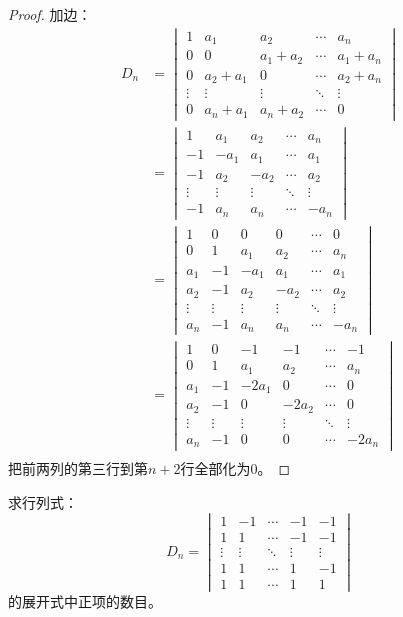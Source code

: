 \begin{proof}
	加边：
	\begin{align*}
		D_n&=
		\begin{vmatrix}
			1 & a_1 & a_2 & \cdots & a_n \\
			0 & 0 & a_1+a_2 & \cdots & a_1+a_n \\
			0 & a_2+a_1 & 0 & \cdots & a_2+a_n \\
			\vdots & \vdots & \vdots & \ddots & \vdots \\
			0 & a_n+a_1 & a_n+a_2 & \cdots & 0
		\end{vmatrix} \\
		&=
		\begin{vmatrix}
			1 & a_1 & a_2 & \cdots & a_n \\
			-1 & -a_1 & a_1 & \cdots & a_1 \\
			-1 & a_2 & -a_2 & \cdots & a_2 \\
			\vdots & \vdots & \vdots & \ddots & \vdots \\
			-1 & a_n & a_n & \cdots & -a_n
		\end{vmatrix} \\
		&=
		\begin{vmatrix}
			1 & 0 & 0 & 0 & \cdots & 0 \\
			0 & 1 & a_1 & a_2 & \cdots & a_n \\
			a_1 & -1 & -a_1 & a_1 & \cdots & a_1 \\
			a_2 & -1 & a_2 & -a_2 & \cdots & a_2 \\
			\vdots & \vdots & \vdots & \vdots & \ddots & \vdots \\
			a_n & -1 & a_n & a_n & \cdots & -a_n
		\end{vmatrix} \\
		&=
		\begin{vmatrix}
			1 & 0 & -1 & -1 & \cdots & -1 \\
			0 & 1 & a_1 & a_2 & \cdots & a_n \\
			a_1 & -1 & -2a_1 & 0 & \cdots & 0 \\
			a_2 & -1 & 0 & -2a_2 & \cdots & 0 \\
			\vdots & \vdots & \vdots & \vdots & \ddots & \vdots \\
			a_n & -1 & 0 & 0 & \cdots & -2a_n
		\end{vmatrix} \\
	\end{align*}
	把前两列的第三行到第$n+2$行全部化为0。
\end{proof}
\begin{theorem}
	求行列式：
	\begin{equation*}
		D_n=
		\begin{vmatrix}
			1 & -1 & \cdots & -1 & -1 \\
			1 & 1 & \cdots & -1 & -1 \\
			\vdots & \vdots & \ddots & \vdots & \vdots \\
			1 & 1 & \cdots & 1 & -1 \\
			1 & 1 & \cdots & 1 & 1
		\end{vmatrix}
	\end{equation*}
	的展开式中正项的数目。
\end{theorem}

